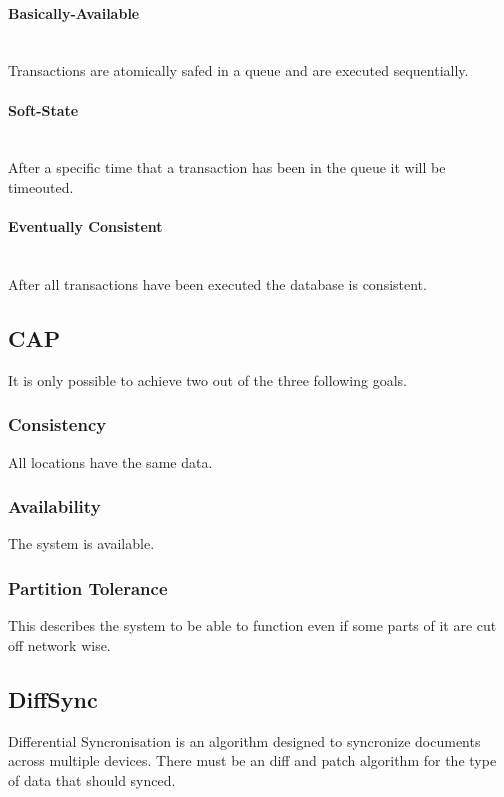 \paragraph{Basically-Available} \mbox{}\\
Transactions are atomically safed in a queue and are executed sequentially.

\paragraph{Soft-State} \mbox{}\\
After a specific time that a transaction has been in the queue it will be timeouted.

\paragraph{Eventually Consistent} \mbox{}\\
After all transactions have been executed the database is consistent.

\subsection{CAP}
It is only possible to achieve two out of the three following goals.

\subsubsection{Consistency}
All locations have the same data.

\subsubsection{Availability}
The system is available.

\subsubsection{Partition Tolerance}
This describes the system to be able to function even if some parts of it are cut off network wise.

\subsection{DiffSync}
Differential Syncronisation is an algorithm designed to syncronize documents across multiple devices. There must be an diff and patch algorithm for the type of data that should synced.

